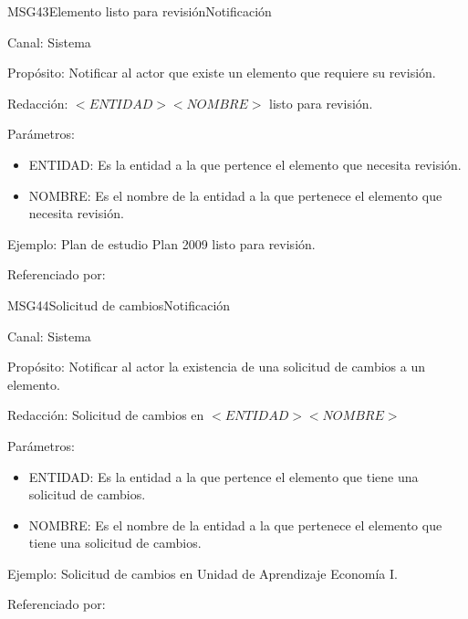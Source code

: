 \begin{mensaje}{MSG43}{Elemento listo para revisión}{Notificación}
	\item[Canal:] Sistema
	\item[Propósito:] Notificar al actor que existe un elemento  que requiere su revisión.
	\item[Redacción:] $<ENTIDAD> <NOMBRE>$ listo para revisión. 
	\item[Parámetros:] 
	\begin{itemize}
		\item ENTIDAD: Es la entidad a la que pertence el elemento que necesita revisión.
		\item NOMBRE: Es el nombre de la entidad a la que pertenece el elemento que necesita revisión.
	\end{itemize}
	\item[Ejemplo:] Plan de estudio Plan 2009 listo para revisión.
	\item[Referenciado por:] 
\end{mensaje}

\begin{mensaje}{MSG44}{Solicitud de cambios}{Notificación}
	\item[Canal:] Sistema
	\item[Propósito:] Notificar al actor la existencia de una solicitud de cambios a un elemento.
	\item[Redacción:] Solicitud de cambios en $<ENTIDAD> <NOMBRE>$
	\item[Parámetros:] 
	\begin{itemize}
		\item ENTIDAD: Es la entidad a la que pertence el elemento que tiene una solicitud de cambios.
		\item NOMBRE: Es el nombre de la entidad a la que pertenece el elemento que tiene una solicitud de cambios.
	\end{itemize}
	\item[Ejemplo:] Solicitud de cambios en Unidad de Aprendizaje Economía I.
	\item[Referenciado por:] 
\end{mensaje}

